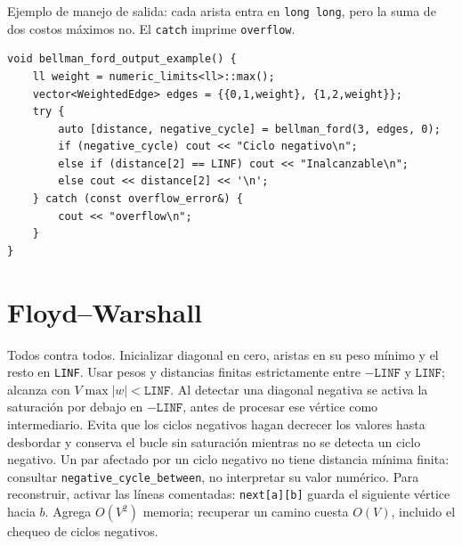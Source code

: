 
Ejemplo de manejo de salida: cada arista entra en \texttt{long long}, pero
la suma de dos costos m\'aximos no. El \texttt{catch} imprime \texttt{overflow}.

\begin{lstlisting}[style=cpp]
void bellman_ford_output_example() {
    ll weight = numeric_limits<ll>::max();
    vector<WeightedEdge> edges = {{0,1,weight}, {1,2,weight}};
    try {
        auto [distance, negative_cycle] = bellman_ford(3, edges, 0);
        if (negative_cycle) cout << "Ciclo negativo\n";
        else if (distance[2] == LINF) cout << "Inalcanzable\n";
        else cout << distance[2] << '\n';
    } catch (const overflow_error&) {
        cout << "overflow\n";
    }
}
\end{lstlisting}

\section{Floyd--Warshall}

Todos contra todos. Inicializar diagonal en cero, aristas en su peso m\'inimo y
el resto en \texttt{LINF}.
Usar pesos y distancias finitas estrictamente entre $-\texttt{LINF}$ y
$\texttt{LINF}$; alcanza con $V\max|w|<\texttt{LINF}$.
Al detectar una diagonal negativa se activa la saturaci\'on por debajo en
$-\texttt{LINF}$, antes de procesar ese v\'ertice como intermediario. Evita
que los ciclos negativos hagan decrecer los valores hasta desbordar y
conserva el bucle sin saturaci\'on mientras no se detecta un ciclo negativo.
Un par afectado por un ciclo negativo no tiene distancia m\'inima finita:
consultar \texttt{negative\_cycle\_between}, no interpretar su valor num\'erico.
Para reconstruir, activar las l\'ineas comentadas: \texttt{next[a][b]} guarda
el siguiente v\'ertice hacia $b$. Agrega $O(V^2)$ memoria; recuperar un camino
cuesta $O(V)$, incluido el chequeo de ciclos negativos.

